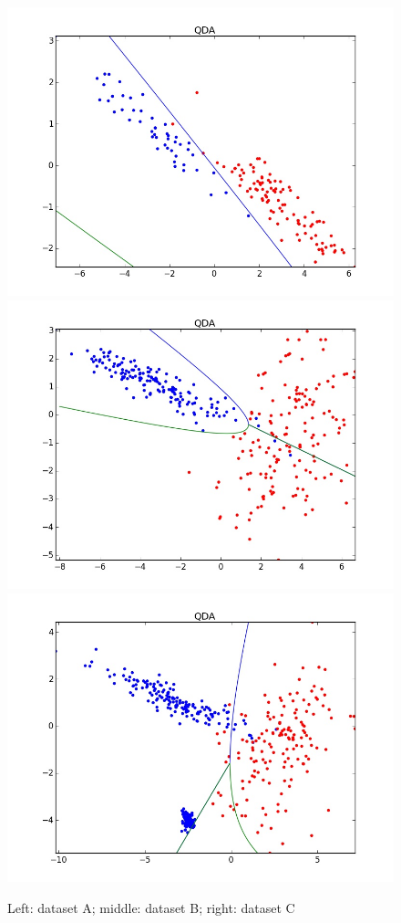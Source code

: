 \documentclass[11pt,a4paper]{article}
\begin{document}
\begin{figure}[H]
\centering
\noindent\includegraphics[scale=0.2]{images/qda_A.jpeg}
\noindent\includegraphics[scale=0.2]{images/qda_B.jpeg}
\noindent\includegraphics[scale=0.2]{images/qda_C.jpeg}
\caption{Left: dataset A; middle: dataset B; right: dataset C}
\end{figure}
\end{document}
